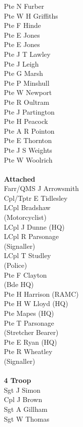 \begin{multicols}{3}
  Pte N Furber \\
  Pte W H Griffiths \\
  Pte F Hinde \\
  Pte E Jones \\
  Pte E Jones \\
  Pte J T Lawley \\
  Pte J Leigh \\
  Pte G Marsh \\
  Pte P Minshull \\
  Pte W Newport \\
  Pte R Oultram \\
  Pte J Partington \\
  Pte H Peacock \\
  Pte A R Pointon \\
  Pte E Thornton \\
  Pte J S Weights \\
  Pte W Woolrich \\
  \\
  \textbf{Attached} \\
  Farr/QMS J Arrowsmith \\
  Cpl/Tptr E Tidlesley \\
  LCpl Bradshaw \\ \indent (Motorcyclist) \\
  LCpl J Dunne (HQ) \\
  LCpl R Parsonage \\ \indent (Signaller) \\
  LCpl T Studley \\ \indent (Police) \\
  Pte F Clayton \\ \indent (Bde HQ) \\
  Pte H Harrison (RAMC) \\
  Pte H W Lloyd (HQ) \\
  Pte Mapes (HQ) \\
  Pte T Parsonage \\ \indent (Stretcher Bearer) \\
  Pte E Ryan (HQ) \\
  Pte R Wheatley \\ \indent (Signaller) \\
  \\
  \textbf{4 Troop} \\
  Sgt J Simon \\
  Cpl J Brown \\
  Sgt A Gillham \\
  Sgt W Thomas \\

\end{multicols}

